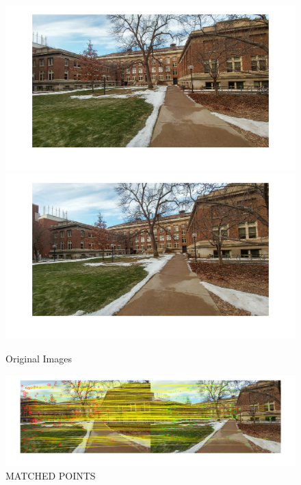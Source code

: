 \documentclass[letter, 10pt]{article}
\begin{document}
\begin{figure}[H]
        \centering
        \includegraphics[width=\textwidth]{HW5/RESULT/im1.png}
    \endminipage\hfill
        \centering
        \includegraphics[width=1.1\textwidth]{HW5/RESULT/im2.png}
    \endminipage\hfill
    \caption{Original Images}
\end{figure}

\begin{figure}[H]
    \centering
    \includegraphics[width=\textwidth]{HW5/RESULT/matched_points.png}
    \caption{MATCHED POINTS}
    \label{fig:my_label}
\end{figure}
\end{document}
